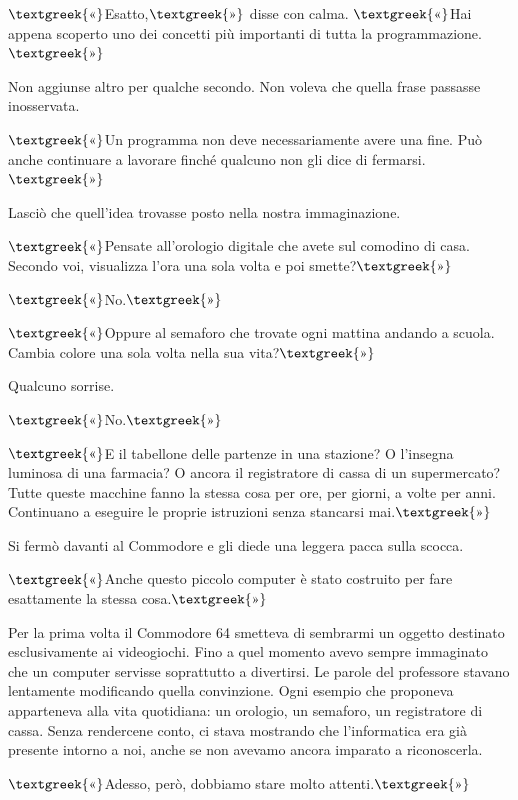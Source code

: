 \documentclass{article}
\begin{document}
$\text{\textgreek{«}}$Esatto,$\text{\textgreek{»}}$ disse con calma. $\text{\textgreek{«}}$Hai appena scoperto uno dei
concetti più importanti di tutta la programmazione.$\text{\textgreek{»}}$

Non aggiunse altro per qualche secondo. Non voleva che quella frase passasse inosservata.

$\text{\textgreek{«}}$Un programma non deve necessariamente avere una fine. Può anche continuare a lavorare finché
qualcuno non gli dice di fermarsi.$\text{\textgreek{»}}$

Lasciò che quell'idea trovasse posto nella nostra immaginazione.

$\text{\textgreek{«}}$Pensate all'orologio digitale che avete sul comodino di casa. Secondo voi, visualizza l'ora una
sola volta e poi smette?$\text{\textgreek{»}}$

$\text{\textgreek{«}}$No.$\text{\textgreek{»}}$

$\text{\textgreek{«}}$Oppure al semaforo che trovate ogni mattina andando a scuola. Cambia colore una sola volta nella
sua vita?$\text{\textgreek{»}}$

Qualcuno sorrise.

$\text{\textgreek{«}}$No.$\text{\textgreek{»}}$

$\text{\textgreek{«}}$E il tabellone delle partenze in una stazione? O l'insegna luminosa di una farmacia? O ancora il
registratore di cassa di un supermercato? Tutte queste macchine fanno la stessa cosa per ore, per giorni, a volte per
anni. Continuano a eseguire le proprie istruzioni senza stancarsi mai.$\text{\textgreek{»}}$

Si fermò davanti al Commodore e gli diede una leggera pacca sulla scocca.

$\text{\textgreek{«}}$Anche questo piccolo computer è stato costruito per fare esattamente la stessa
cosa.$\text{\textgreek{»}}$

Per la prima volta il Commodore 64 smetteva di sembrarmi un oggetto destinato esclusivamente ai videogiochi. Fino a quel
momento avevo sempre immaginato che un computer servisse soprattutto a divertirsi. Le parole del professore stavano
lentamente modificando quella convinzione. Ogni esempio che proponeva apparteneva alla vita quotidiana: un orologio, un
semaforo, un registratore di cassa. Senza rendercene conto, ci stava mostrando che l'informatica era già presente
intorno a noi, anche se non avevamo ancora imparato a riconoscerla.

$\text{\textgreek{«}}$Adesso, però, dobbiamo stare molto attenti.$\text{\textgreek{»}}$
\end{document}
